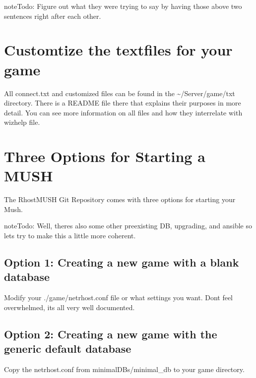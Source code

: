 \documentclass[letterpaper,10pt,english]{sphinxmanual}
\begin{document}
\begin{sphinxadmonition}{note}{\label{\detokenize{install:id7}}Todo:}
\sphinxAtStartPar
Figure out what they were trying to say by having those above two sentences right after each other.
\end{sphinxadmonition}


\section{Customtize the textfiles for your game}
\label{\detokenize{install:customtize-the-textfiles-for-your-game}}
\sphinxAtStartPar
All connect.txt and customized files can be found in the \textasciitilde{}/Server/game/txt directory.  There is a
README file there that explains their purposes in more detail.  You can see more information on
all files and how they inter\sphinxhyphen{}relate with \textquotesingle{}wizhelp file\textquotesingle{}.


\section{Three Options for Starting a MUSH}
\label{\detokenize{install:three-options-for-starting-a-mush}}
\sphinxAtStartPar
The RhostMUSH Git Repository comes with three options for starting your Mush.

\begin{sphinxadmonition}{note}{\label{\detokenize{install:id8}}Todo:}
\sphinxAtStartPar
Well, there\textquotesingle{}s also some other pre\sphinxhyphen{}existing DB, upgrading, and ansible so let\textquotesingle{}s try to make this a little more coherent.
\end{sphinxadmonition}


\subsection{Option 1: Creating a new game with a blank database}
\label{\detokenize{install:option-1-creating-a-new-game-with-a-blank-database}}
\sphinxAtStartPar
Modify your ./game/netrhost.conf file or what settings you want.
Don\textquotesingle{}t feel overwhelmed, it\textquotesingle{}s all very well documented.


\subsection{Option 2: Creating a new game with the generic default database}
\label{\detokenize{install:option-2-creating-a-new-game-with-the-generic-default-database}}
\sphinxAtStartPar
Copy the netrhost.conf from minimal\sphinxhyphen{}DBs/minimal\_db to your game directory.
\end{document}
